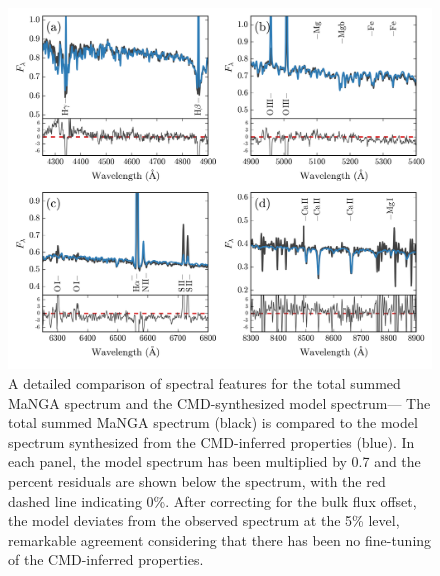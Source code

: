 \documentclass[preprint2]{aastex62}
\newcommand{\nii}{[N\,{\sc ii}]\xspace}
\newcommand{\sii}{[S\,{\sc ii}]\xspace}
\newcommand{\oiii}{[O\,{\sc iii}]\xspace}
\newcommand{\ha}{\ensuremath{\mathrm{H\alpha}}\xspace}
\newcommand{\ang}{\ensuremath{\mbox{\AA}}\xspace}
\begin{document}
\begin{figure}
  \begin{center}
    \includegraphics[width=\linewidth]{figs/f7.png}
    \caption{{\sc A detailed comparison of spectral features for the total summed MaNGA spectrum and the CMD-synthesized model spectrum---} The total summed MaNGA spectrum (black) is compared to the model spectrum synthesized from the CMD-inferred properties (blue). In each panel, the model spectrum has been multiplied by 0.7 and the percent residuals are shown below the spectrum, with the red dashed line indicating 0\%. After correcting for the bulk flux offset, the model deviates from the observed spectrum at the 5\% level, remarkable agreement considering that there has been no fine-tuning of the CMD-inferred properties.}
    \label{fig:zoomSpec}
  \end{center}
\end{figure}
\end{document}
